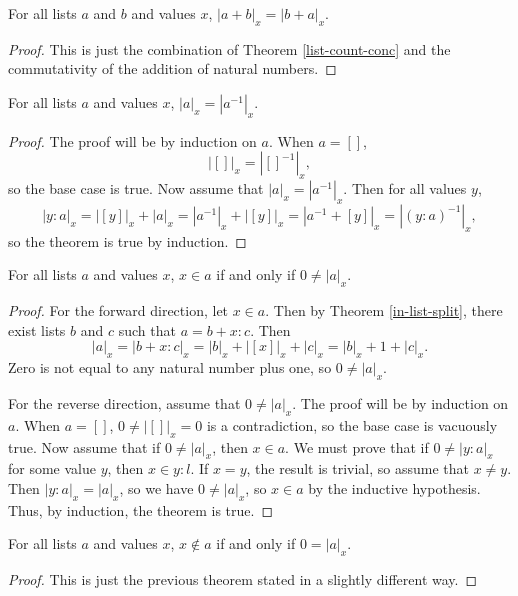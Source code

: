\documentclass[../math.tex]{subfiles}
\begin{document}
\begin{theorem} \label{list-count-comm}
    For all lists $a$ and $b$ and values $x$, $|a + b|_x = |b + a|_x$.
\end{theorem}
\begin{proof}
    This is just the combination of Theorem \ref{list-count-conc} and the
    commutativity of the addition of natural numbers.
\end{proof}

\begin{theorem} \label{list-count-reverse}
    For all lists $a$ and values $x$, $|a|_x = |a^{-1}|_x$.
\end{theorem}
\begin{proof}
    The proof will be by induction on $a$.  When $a = []$,
    \[
        |[]|_x = |[]^{-1}|_x,
    \]
    so the base case is true.  Now assume that $|a|_x = |a^{-1}|_x$.  Then for
    all values $y$,
    \[
        |y : a|_x = |[y]|_x + |a|_x = |a^{-1}|_x + |[y]|_x = |a^{-1} + [y]|_x
        = |(y : a)^{-1}|_x,
    \]
    so the theorem is true by induction.
\end{proof}

\begin{theorem} \label{list-count-in}
    For all lists $a$ and values $x$, $x \in a$ if and only if $0 \neq |a|_x$.
\end{theorem}
\begin{proof}
    For the forward direction, let $x \in a$.  Then by Theorem
    \ref{in-list-split}, there exist lists $b$ and $c$ such that $a = b + x :
    c$.  Then
    \[
        |a|_x = |b + x : c|_x = |b|_x + |[x]|_x + |c|_x = |b|_x + 1 + |c|_x.
    \]
    Zero is not equal to any natural number plus one, so $0 \neq |a|_x$.

    For the reverse direction, assume that $0 \neq |a|_x$.  The proof will be by
    induction on $a$.  When $a = []$, $0 \neq |[]|_x = 0$ is a contradiction, so
    the base case is vacuously true.  Now assume that if $0 \neq |a|_x$, then $x
    \in a$.  We must prove that if $0 \neq |y : a|_x$ for some value $y$, then
    $x \in y : l$.  If $x = y$, the result is trivial, so assume that $x \neq
    y$.  Then $|y : a|_x = |a|_x$, so we have $0 \neq |a|_x$, so $x \in a$ by
    the inductive hypothesis.  Thus, by induction, the theorem is true.
\end{proof}

\begin{theorem} \label{list-count-nin}
    For all lists $a$ and values $x$, $x \notin a$ if and only if $0 = |a|_x$.
\end{theorem}
\begin{proof}
    This is just the previous theorem stated in a slightly different way.
\end{proof}
\end{document}
